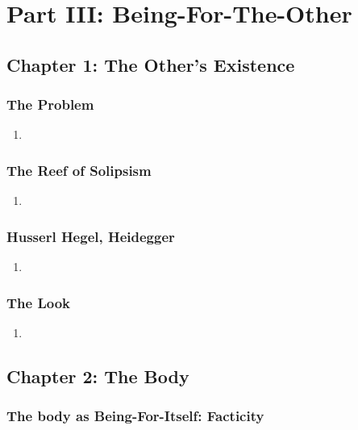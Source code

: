 \section{Part III: Being-For-The-Other}

\subsection{Chapter 1: The Other's Existence}

\subsubsection{The Problem}

\begin{enumerate}
  \item
\end{enumerate}

\subsubsection{The Reef of Solipsism}

\begin{enumerate}
  \item
\end{enumerate}

\subsubsection{Husserl Hegel, Heidegger}

\begin{enumerate}
  \item
\end{enumerate}

\subsubsection{The Look}

\begin{enumerate}
  \item
\end{enumerate}

\subsection{Chapter 2: The Body}

\subsubsection{The body as Being-For-Itself: Facticity}

